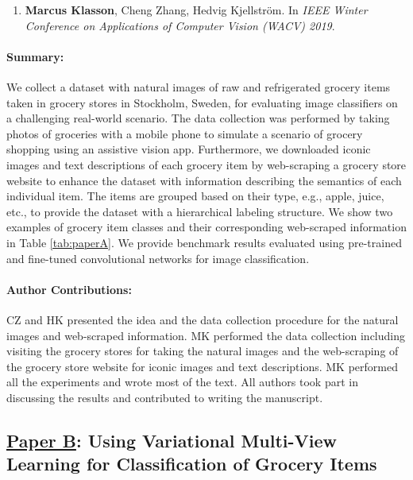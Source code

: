 \begin{enumerate}
	\item[] \textbf{Marcus Klasson}, Cheng Zhang, Hedvig Kjellström. In \textit{IEEE Winter Conference on Applications of Computer Vision (WACV) 2019}.
\end{enumerate}

\vspace{-3mm}
\paragraph{Summary:} We collect a dataset with natural images of raw and refrigerated grocery items taken in grocery stores in Stockholm, Sweden, for evaluating image classifiers on a challenging real-world scenario. The data collection was performed by taking photos of groceries with a mobile phone to simulate a scenario of grocery shopping using an assistive vision app. Furthermore, we downloaded iconic images and text descriptions of each grocery item by web-scraping a grocery store website to enhance the dataset with information describing the semantics of each individual item. The items are grouped based on their type, e.g., apple, juice, etc., to provide the dataset with a hierarchical labeling structure. We show two examples of grocery item classes and their corresponding web-scraped information in Table \ref{tab:paperA}. We provide benchmark results evaluated using pre-trained and fine-tuned convolutional networks for image classification.

\vspace{-3mm}
\paragraph{Author Contributions:}
CZ and HK presented the idea and the data collection procedure for the natural images and web-scraped information. MK performed the data collection including visiting the grocery stores for taking the natural images and the web-scraping of the grocery store website for iconic images and text descriptions. MK performed all the experiments and wrote most of the text. All authors took part in discussing the results and contributed to writing the manuscript. 


\subsection{\underline{Paper B}: Using Variational Multi-View Learning for Classification of Grocery Items}

